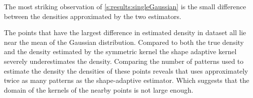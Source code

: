 
	The most striking observation of \cref{s:results:singleGaussian} is the small difference between the densities approximated by the two estimators. 










	The points that have the largest difference in estimated density in dataset \ferdosiOne all lie near the mean of the Gaussian distribution. Compared to both the true density and the density estimated by the symmetric kernel the shape adaptive kernel severely underestimates the density. Comparing the number of patterns used to estimate the density the densities of these points reveals that \mbe uses approximately twice as many patterns as the shape-adaptive estimator. Which suggests that the domain of the kernels of the nearby points is not large enough. 

